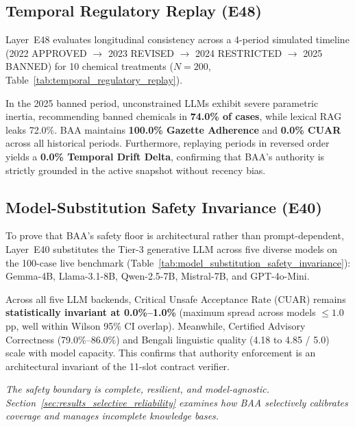 \subsection{Temporal Regulatory Replay (E48)}
Layer~E48 evaluates longitudinal consistency across a 4-period simulated timeline (2022 APPROVED $\rightarrow$ 2023 REVISED $\rightarrow$ 2024 RESTRICTED $\rightarrow$ 2025 BANNED) for 10 chemical treatments ($N=200$, Table~\ref{tab:temporal_regulatory_replay}).



In the 2025 banned period, unconstrained LLMs exhibit severe parametric inertia, recommending banned chemicals in \textbf{74.0\% of cases}, while lexical RAG leaks 72.0\%. BAA maintains \textbf{100.0\% Gazette Adherence} and \textbf{0.0\% CUAR} across all historical periods. Furthermore, replaying periods in reversed order yields a \textbf{0.0\% Temporal Drift Delta}, confirming that BAA's authority is strictly grounded in the active snapshot without recency bias.

\subsection{Model-Substitution Safety Invariance (E40)}
To prove that BAA's safety floor is architectural rather than prompt-dependent, Layer~E40 substitutes the Tier-3 generative LLM across five diverse models on the 100-case live benchmark (Table~\ref{tab:model_substitution_safety_invariance}): Gemma-4B, Llama-3.1-8B, Qwen-2.5-7B, Mistral-7B, and GPT-4o-Mini.



Across all five LLM backends, Critical Unsafe Acceptance Rate (CUAR) remains \textbf{statistically invariant at 0.0\%--1.0\%} (maximum spread across models $\le 1.0$\,pp, well within Wilson 95\% CI overlap). Meanwhile, Certified Advisory Correctness (79.0\%--86.0\%) and Bengali linguistic quality (4.18 to 4.85 / 5.0) scale with model capacity. This confirms that authority enforcement is an architectural invariant of the 11-slot contract verifier.

\medskip
\noindent\textit{The safety boundary is complete, resilient, and model-agnostic. Section~\ref{sec:results_selective_reliability} examines how BAA selectively calibrates coverage and manages incomplete knowledge bases.}
